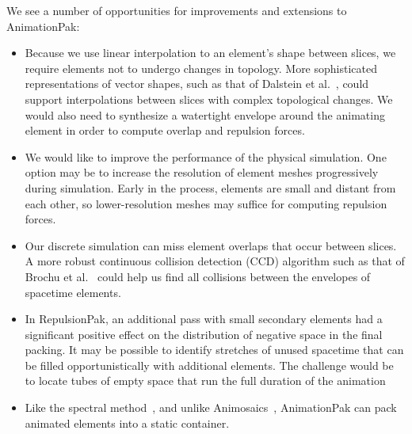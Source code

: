 \nnewtext
{
We see a number of opportunities for improvements and extensions to AnimationPak:}
\begin{itemize}
\item {}
Because we use linear interpolation to  an element's shape
  between slices, we require elements not to undergo changes in 
  topology.  More sophisticated representations of vector shapes,
  such as that of Dalstein et al.~\cite{Dalstein2015}, could support
  interpolations between slices with complex topological changes.
  We would also need to synthesize a watertight envelope around the
  animating element in order to compute overlap and repulsion forces.

\item {}
We would like to improve the performance of the physical simulation.
  One option may be to increase the resolution of element meshes 
  progressively during simulation.  Early in the process, elements are
  small and distant from each other, so lower-resolution
  meshes may suffice for computing repulsion forces.

\item {}
  Our discrete simulation can miss element overlaps that occur between
  slices.  A more robust continuous collision detection (CCD) algorithm
  such as that of Brochu et al.~\cite{Brochu2012}
  could help us find all collisions between
  the envelopes of spacetime elements.

\item {}
In RepulsionPak, an additional pass with
  small secondary elements had a significant positive effect on the
  distribution of negative space in the final packing.  It may be
  possible to identify stretches of unused spacetime that can be filled
  opportunistically with additional elements.  The challenge would be
  to locate tubes of empty space that run the full duration of the animation

\item {}
Like the spectral method~\cite{Dalal2006}, and unlike
  Animosaics~\cite{Smith2005}, AnimationPak can pack animated 
  elements into a static container. 


\end{itemize}
